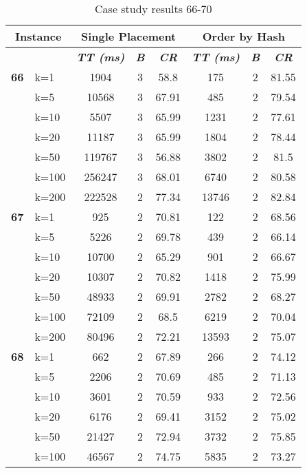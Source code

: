     \begin{table}[htbp]
    \caption{Case study results 66-70}
    \centering
    \begin{tabular}{|l|l|c|c|c|c|c|c|}
    \hline
    \multicolumn{ 2}{|c|}{\textbf{Instance}} & \multicolumn{ 3}{c|}{\textbf{Single Placement}} & \multicolumn{ 3}{c|}{\textbf{Order by Hash}} \\ \hline
    \multicolumn{ 2}{|l|}{} & \textbf{\textit{TT (ms)}} & \textbf{\textit{B}} & \textbf{\textit{CR}} & \textbf{\textit{TT (ms)}} & \textbf{\textit{B}} & \textbf{\textit{CR}} \\ \hline
    \multicolumn{1}{|r|}{\textbf{66}} & k=1 & 1904 & 3 & 58.8 & 175 & 2 & 81.55 \\ 
     & k=5 & 10568 & 3 & 67.91 & 485 & 2 & 79.54 \\ 
     & k=10 & 5507 & 3 & 65.99 & 1231 & 2 & 77.61 \\ 
     & k=20 & 11187 & 3 & 65.99 & 1804 & 2 & 78.44 \\ 
     & k=50 & 119767 & 3 & 56.88 & 3802 & 2 & 81.5 \\ 
     & k=100 & 256247 & 3 & 68.01 & 6740 & 2 & 80.58 \\ 
     & k=200 & 222528 & 2 & 77.34 & 13746 & 2 & 82.84 \\ \hline
    \multicolumn{1}{|r|}{\textbf{67}} & k=1 & 925 & 2 & 70.81 & 122 & 2 & 68.56 \\ 
     & k=5 & 5226 & 2 & 69.78 & 439 & 2 & 66.14 \\ 
     & k=10 & 10700 & 2 & 65.29 & 901 & 2 & 66.67 \\ 
     & k=20 & 10307 & 2 & 70.82 & 1418 & 2 & 75.99 \\ 
     & k=50 & 48933 & 2 & 69.91 & 2782 & 2 & 68.27 \\ 
     & k=100 & 72109 & 2 & 68.5 & 6219 & 2 & 70.04 \\ 
     & k=200 & 80496 & 2 & 72.21 & 13593 & 2 & 75.07 \\ \hline
    \multicolumn{1}{|r|}{\textbf{68}} & k=1 & 662 & 2 & 67.89 & 266 & 2 & 74.12 \\ 
     & k=5 & 2206 & 2 & 70.69 & 485 & 2 & 71.13 \\ 
     & k=10 & 3601 & 2 & 70.59 & 933 & 2 & 72.56 \\ 
     & k=20 & 6176 & 2 & 69.41 & 3152 & 2 & 75.02 \\ 
     & k=50 & 21427 & 2 & 72.94 & 3732 & 2 & 75.85 \\ 
     & k=100 & 46567 & 2 & 74.75 & 5835 & 2 & 73.27 \\ 

\end{tabular}
\end{table}

